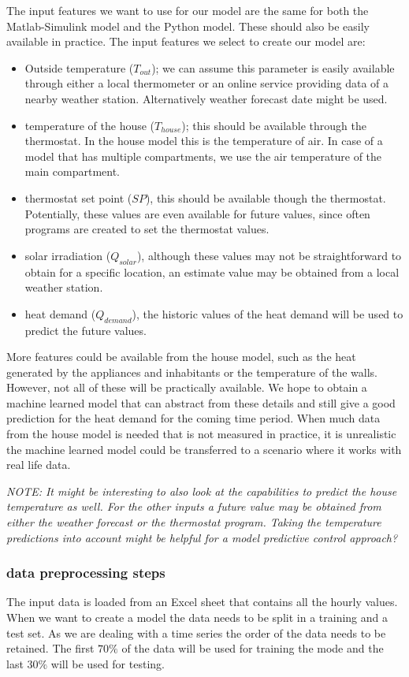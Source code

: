 The input features we want to use for our model are the same for both the Matlab-Simulink model and the Python model. These should also be easily available in practice. The input features we select to create our model are:
\begin{itemize}
\item Outside temperature ($T_{out}$); we can assume this parameter is easily available through either a local thermometer or an online service providing data of a nearby weather station. Alternatively weather forecast date might be used. 
\item temperature of the house ($T_{house}$); this should be available through the thermostat. In the house model this is the temperature of air. In case of a model that has multiple compartments, we use the air temperature of the main compartment.
\item thermostat set point ($SP$), this should be available though the thermostat. Potentially, these values are even available for future values, since often programs are created to set the thermostat values. 
\item solar irradiation ($Q_{solar}$), although these values may not be straightforward to obtain for a specific location, an estimate value may be obtained from a local weather station. 
\item heat demand ($Q_{demand}$), the historic values of the heat demand will be used to predict the future values. 
\end{itemize}

More features could be available from the house model, such as the heat generated by the appliances and inhabitants or the temperature of the walls. However, not all of these will be practically available. We hope to obtain a machine learned model that can abstract from these details and still give a good prediction for the heat demand for the coming time period. When much data from the house model is needed that is not measured in practice, it is unrealistic the machine learned model could be transferred to a scenario where it works with real life data.  

\textit{NOTE: It might be interesting to also look at the capabilities to predict the house temperature as well. For the other inputs a future value may be obtained from either the weather forecast or the thermostat program. Taking the temperature predictions into account might be helpful for a model predictive control approach?}

\subsubsection{data preprocessing steps}
The input data is loaded from an Excel sheet that contains all the hourly values. When we want to create a model the data needs to be split in a training and a test set. As we are dealing with a time series the order of the data needs to be retained. The first $70\%$ of the data will be used for training the mode and the last $30\%$ will be used for testing. 

